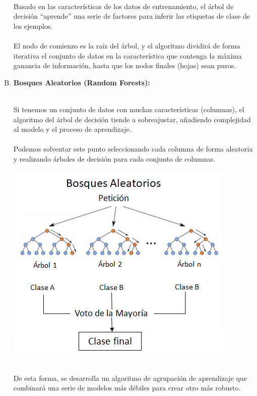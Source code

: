 \documentclass[11pt,a4paper]{article}
\begin{document}
\begin{enumerate}[A.]
			\\Basado en las características de los datos de entrenamiento, el árbol de decisión “aprende” una serie de factores para inferir las etiquetas de clase de los ejemplos.\\

            \\El nodo de comienzo es la raíz del árbol, y el algoritmo dividirá de forma iterativa el conjunto de datos en la característica que contenga la máxima ganancia de información, hasta que los nodos finales (hojas) sean puros.\\

            \item \textbf{Bosques Aleatorios (Random Forests):}
            
			\\Si tenemos un conjunto de datos con muchas características (columnas), el algoritmo del árbol de decisión tiende a sobreajustar, añadiendo complejidad al modelo y el proceso de aprendizaje.\\
            
            \\Podemos solventar este punto seleccionando cada columna de forma aleatoria y realizando árboles de decisión para cada conjunto de columnas.\\
			
			\begin{center}
		    \includegraphics[scale=0.7]{./Imagenes/BosqueAleatorios}
		    \end{center}
			
			\\De esta forma, se desarrolla un algoritmo de agrupación de aprendizaje que combinará una serie de modelos más débiles para crear otro más robusto.\\
            

\end{enumerate}
\end{document}

